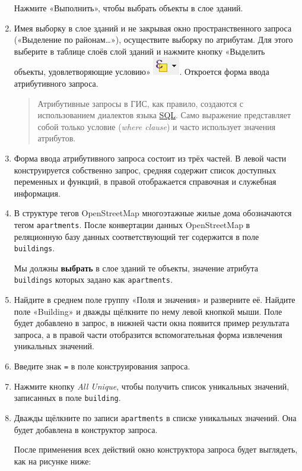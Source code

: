 \documentclass[
  12pt,
]{book}
\begin{document}
\begin{enumerate}
  Нажмите «Выполнить», чтобы выбрать объекты в слое зданий.
\item
  Имея выборку в слое зданий и не закрывая окно пространственного запроса («Выделение по районам\ldots»), осуществите выборку по атрибутам. Для этого выберите в таблице слоёв слой зданий и нажмите кнопку «Выделить объекты, удовлетворяющие условию» \includegraphics{images/Ex05/selection3.png}. Откроется форма ввода атрибутивного запроса.

  \begin{quote}
  Атрибутивные запросы в ГИС, как правило, создаются с использованием диалектов языка \href{https://ru.wikipedia.org/wiki/SQL}{SQL}. Само выражение представляет собой только условие (\emph{where clause}) и часто использует значения атрибутов.
  \end{quote}
\item
  Форма ввода атрибутивного запроса состоит из трёх частей. В левой части конструируется собственно запрос, средняя содержит список доступных переменных и функций, в правой отображается справочная и служебная информация.
\item
  В структуре тегов OpenStreetMap многоэтажные жилые дома обозначаются тегом \texttt{apartments}. После конвертации данных OpenStreetMap в реляционную базу данных соответствующий тег содержится в поле \texttt{buildings}.

  Мы должны \textbf{выбрать} в слое зданий те объекты, значение атрибута \texttt{buildings} которых задано как \texttt{apartments}.
\item
  Найдите в среднем поле группу «Поля и значения» и разверните её. Найдите поле «Building» и дважды щёлкните по нему левой кнопкой мыши. Поле будет добавлено в запрос, в нижней части окна появится пример результата запроса, а в правой части отобразится вспомогательная форма извлечения уникальных значений.
\item
  Введите знак \texttt{=} в поле конструирования запроса.
\item
  Нажмите кнопку \emph{All Unique}, чтобы получить список уникальных значений, записанных в поле \texttt{building}.
\item
  Дважды щёлкните по записи \texttt{apartments} в списке уникальных значений. Она будет добавлена в конструктор запроса.

  После применения всех действий окно конструктора запроса будет выглядеть, как на рисунке ниже:


\end{enumerate}
\end{document}
